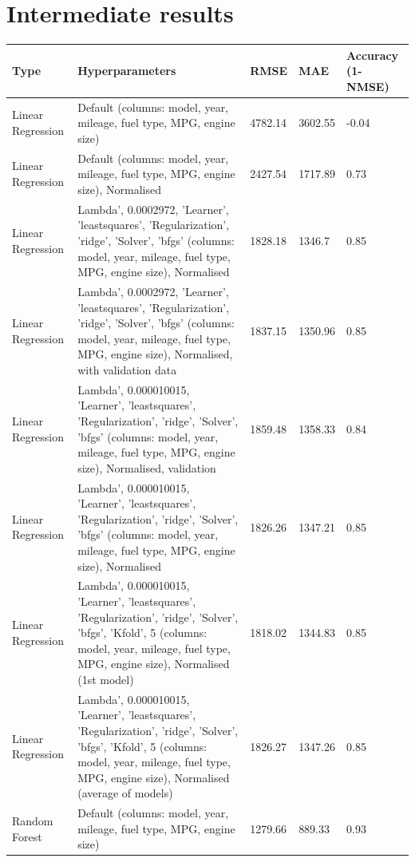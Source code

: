 \documentclass[a4pape, 11pt, english]{article}
\begin{document}
\section{Intermediate results}
\begin{longtable}{m{3.4cm}m{6.6cm}m{1.5cm}m{1.5cm}m{1.5cm}}
\toprule
Type & Hyperparameters & RMSE & MAE & Accuracy (1-NMSE) \\
\midrule
Linear Regression & Default (columns: model, year, mileage, fuel type, MPG, engine size) & 4782.14 & 3602.55 & -0.04 \\
\addlinespace
\hline
Linear Regression & Default (columns: model, year, mileage, fuel type, MPG, engine size), Normalised & 2427.54 & 1717.89 & 0.73 \\
\addlinespace
\hline
Linear Regression & Lambda', 0.0002972, 'Learner', 'leastsquares', 'Regularization', 'ridge', 'Solver', 'bfgs' (columns: model, year, mileage, fuel type, MPG, engine size), Normalised & 1828.18 & 1346.7 & 0.85 \\
\addlinespace
\hline
Linear Regression & Lambda', 0.0002972, 'Learner', 'leastsquares', 'Regularization', 'ridge', 'Solver', 'bfgs' (columns: model, year, mileage, fuel type, MPG, engine size), Normalised, with validation data & 1837.15 & 1350.96 & 0.85 \\
\addlinespace
\hline
Linear Regression & Lambda', 0.000010015, 'Learner', 'leastsquares', 'Regularization', 'ridge', 'Solver', 'bfgs' (columns: model, year, mileage, fuel type, MPG, engine size), Normalised, validation & 1859.48 & 1358.33 & 0.84 \\
\addlinespace
\hline
Linear Regression & Lambda', 0.000010015, 'Learner', 'leastsquares', 'Regularization', 'ridge', 'Solver', 'bfgs' (columns: model, year, mileage, fuel type, MPG, engine size), Normalised & 1826.26 & 1347.21 & 0.85 \\
\addlinespace
\hline
Linear Regression & Lambda', 0.000010015, 'Learner', 'leastsquares', 'Regularization', 'ridge', 'Solver', 'bfgs', 'Kfold', 5 (columns: model, year, mileage, fuel type, MPG, engine size), Normalised (1st model) & 1818.02 & 1344.83 & 0.85 \\
\addlinespace
\hline
Linear Regression & Lambda', 0.000010015, 'Learner', 'leastsquares', 'Regularization', 'ridge', 'Solver', 'bfgs', 'Kfold', 5 (columns: model, year, mileage, fuel type, MPG, engine size), Normalised (average of models) & 1826.27 & 1347.26 & 0.85 \\
\addlinespace
\hline
Random Forest & Default (columns: model, year, mileage, fuel type, MPG, engine size) & 1279.66 & 889.33 & 0.93 \\

\end{longtable}
\end{document}
